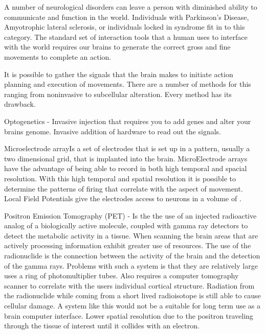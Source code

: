 \label{chapter:problem}

\newlength{\savedunitlength}
\setlength{\unitlength}{2em}

A number of neurological disorders can leave a person with diminished ability to communicate and function in the world.
Individuals with Parkinson's Disease, Amyotrophic lateral sclerosis, or individuals locked in syndrome\cite {} fit in 
to this category.
The standard set of interaction tools that a human uses to interface with the world requires our brains to generate 
the correct gross and fine movements to complete an action.

It is possible to gather the signals that the brain makes to initiate action planning and execution of movements. 
There are a number of methods for this ranging from noninvasive to subcellular alteration. Every method has its drawback.  

Optogenetics - Invasive injection that requires you to add genes and alter your brains genome. Invasive addition of 
hardware to read out the signals.

Microelectrode array\cite {}Is a set of electrodes that is set up in a pattern, usually a two dimensional grid, 
that is implanted into the brain. MicroElectrode arrays have the advantage of being able to record in both high 
temporal and spacial resolution. With this high temporal and spatial resolution it is possible to determine the 
patterns of firing that correlate with the aspect of movement. Local Field Potentials give the electrodes access 
to neurons in a volume of \cite {}.

Positron Emission Tomography\cite{} (PET) - Is the the use of an injected radioactive analog of a biologically active 
molecule\cite{}, coupled with gamma ray detectors to detect the metabolic activity in a tissue. When scanning the 
brain areas that are actively processing information exhibit greater use of resources. The use of the radionuclide 
is the connection between the activity of the brain and the detection of the gamma rays. Problems with such a system 
is that they are relatively large uses a ring of  photomultiplier tubes. Also requires a computer tomography scanner 
to correlate with the users individual cortical structure. Radiation from the radionuclide while coming from a short 
lived radioisotope is still able to cause cellular damage. A system like this would not be a suitable for long term 
use as a brain computer interface. Lower spatial resolution due to the positron traveling through the tissue of 
interest until it collides with an electron.

